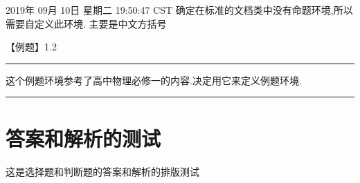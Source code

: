 \documentclass[a4paper,fontset = windowsnew]{ctexbook}
\begin{document}
2019年 09月 10日 星期二 19:50:47 CST
确定在标准的文档类中没有命题环境,所以需要自定义此环境.
主要是中文方括号

\parindent=0pt
【{\heiti 例题}】1.2
\vspace{2pt}
\hrule
\vspace{10pt}

\ccwd
 这个例题环境参考了高中物理必修一的内容.决定用它来定义例题环境.

\vspace{10pt}
\hrule

\newpage
\section{答案和解析的测试}

这是选择题和判断题的答案和解析的排版测试

\makeanswer
\end{document}
